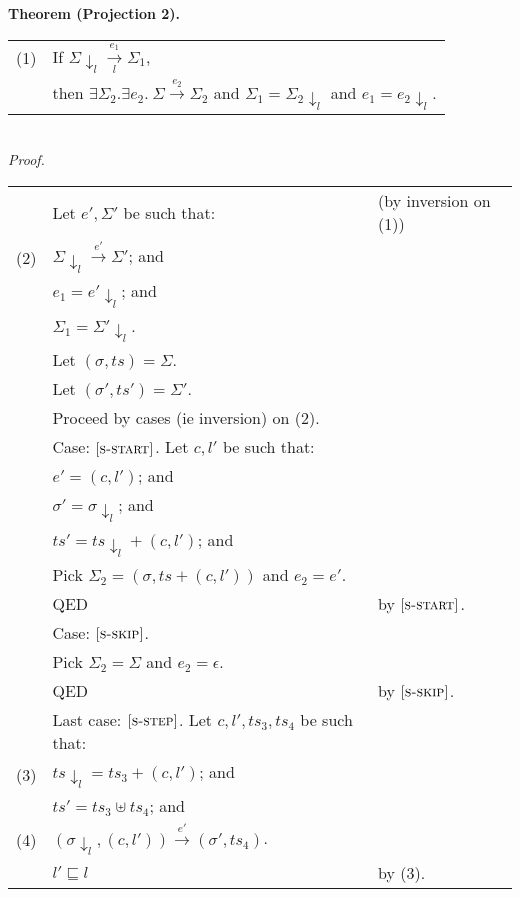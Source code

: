 \documentclass{article}
\newcommand{\rn}[1]{\text{\textsc{[#1]}}}
\newcommand{\tsteparrow}[1]{\overset{#1}{\longrightarrow}}
\newcommand{\tstep}[3]{#2\tsteparrow{#1}#3}
\newcommand{\ssteparrow}[1]{\overset{#1}{\longrightarrow}}
\newcommand{\sstep}[3]{#2\ssteparrow{#1}#3}
\newcommand{\lssteparrow}[2]{\overset{#2}{\underset{#1}{\longrightarrow}}}
\newcommand{\lsstep}[4]{#3\lssteparrow{#1}{#2}#4}
\newcommand{\thread}[2]{(#1,#2)}
\newcommand{\proj}[2]{#1{\downarrow_{#2}}}
\begin{document}
\newpage
\noindent
%
%
\textbf{Theorem (Projection 2).}
\\
\begin{tabular}{l@{$\qquad$}l}
  (1) & If $\lsstep{l}{e_1}{\proj{\Sigma}{l}}{\Sigma_1}$,
\\
      & then $\exists \Sigma_2.\exists e_2.~\sstep{e_2}{\Sigma}{\Sigma_2}$
        and $\Sigma_1 = \proj{\Sigma_2}{l}$
        and $e_1 = \proj{e_2}{l}$.
\end{tabular}
\\
\textit{Proof.}
\\
\begin{tabular}{l@{$\qquad$}l@{\qquad}l}
        & Let $e',\Sigma'$ be such that:
        & (by inversion on (1))
\\
  (2)   & $\sstep{e'}{\proj{\Sigma}{l}}{\Sigma'}$; and
\\
        & $e_1=\proj{e'}{l}$; and
\\
        & $\Sigma_1=\proj{\Sigma'}{l}$.
\\
        & Let $(\sigma,ts)=\Sigma$.
\\
        & Let $(\sigma',ts')=\Sigma'$.
\\
        & Proceed by cases (ie inversion) on (2).
\\
        & Case: $\rn{s-start}$. Let $c,l'$ be such that:
\\
        & \z $e'=\thread{c}{l'}$; and
\\
        & \z $\sigma'=\proj{\sigma}{l}$; and
\\
        & \z $ts'=\proj{ts}{l}+\thread{c}{l'}$; and
\\
        & \z Pick $\Sigma_2 = (\sigma,ts+\thread{c}{l'})$ and $e_2=e'$.
\\
        & \z QED
        & by $\rn{s-start}$.
\\
        & Case: $\rn{s-skip}$.
\\
        & \z Pick $\Sigma_2=\Sigma$ and $e_2=\epsilon$.
\\
        & \z QED
        & by $\rn{s-skip}$.
\\
        & Last case: $\rn{s-step}$. Let $c,l',ts_3,ts_4$ be such that:
\\
  (3)   & $\proj{ts}{l}=ts_3+\thread{c}{l'}$; and
\\
        & $ts'=ts_3\uplus ts_4$; and
\\
  (4)   & $\tstep{e'}{(\proj{\sigma}{l},\thread{c}{l'})}{(\sigma',ts_4)}$.
\\
        & $l'\sqsubseteq l$
        & by (3).
\\

\end{tabular}
\end{document}
